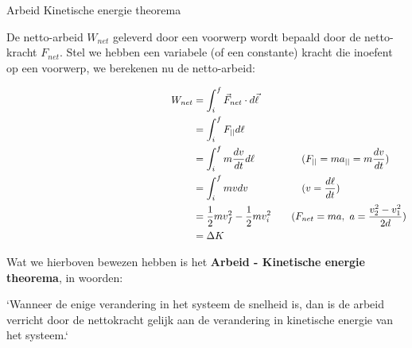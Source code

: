 \begin{lem}{Arbeid Kinetische energie theorema}

De netto-arbeid $ W_{net} $ geleverd door een voorwerp wordt bepaald door de netto-kracht $ F_{net} $. Stel we hebben een variabele (of een constante) kracht die inoefent op een voorwerp, we berekenen nu de netto-arbeid: 

\begin{align*}
    W_{net} &= \int_i^f \Vec{F}_{net} \cdot d\Vec{\ell} \\
            &= \int_i^f F_{||}d\ell \\
 \hspace{6.5cm} &= \int_i^f m\dfrac{dv}{dt}d\ell \qquad \qquad \ \ (F_{||} = ma_{||} = m\dfrac{dv}{dt}) \\
            &= \int_i^f mvdv \qquad \qquad \quad \  (v=\dfrac{d\ell}{dt}) \\
\hspace{6.5cm} &= \dfrac{1}{2}mv_f^2 - \dfrac{1}{2}mv_i^2 \quad \quad (F_{net} = ma, \ a = \dfrac{v_2^2 - v_1^2}{2d}) \\ 
            &= \Delta K 
\end{align*}

\noindent Wat we hierboven bewezen hebben is het \textbf{Arbeid - Kinetische energie theorema}, in woorden: 

\vspace{0.3cm} \noindent  `Wanneer de enige verandering in het systeem de snelheid is, dan is de arbeid verricht door de nettokracht gelijk aan de verandering in kinetische energie van het systeem.`

\end{lem}
